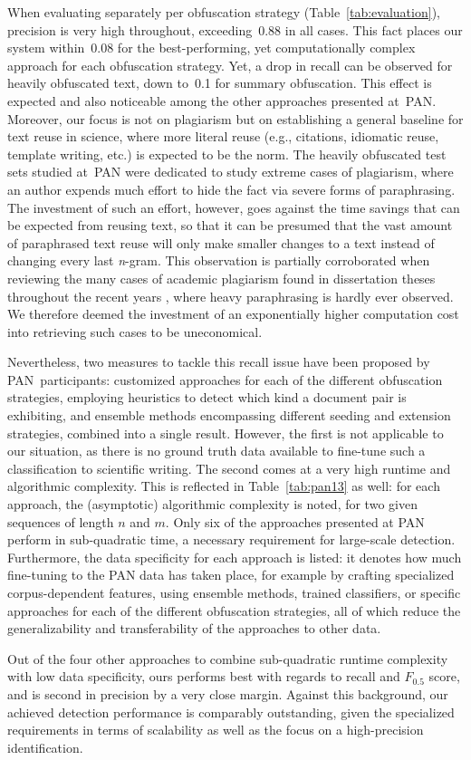 When evaluating separately per obfuscation strategy (Table~\ref{tab:evaluation}), precision is very high throughout, exceeding~0.88 in all cases. This fact places our system within~0.08 for the best-performing, yet computationally complex approach for each obfuscation strategy. Yet, a drop in recall can be observed for heavily obfuscated text, down to~0.1 for summary obfuscation. This effect is expected and also noticeable among the other approaches presented at~PAN. Moreover, our focus is not on plagiarism but on establishing a general baseline for text reuse in science, where more literal reuse (e.g., citations, idiomatic reuse, template writing, etc.) is expected to be the norm. The heavily obfuscated test sets studied at~PAN were dedicated to study extreme cases of plagiarism, where an author expends much effort to hide the fact via severe forms of paraphrasing. The investment of such an effort, however, goes against the time savings that can be expected from reusing text, so that it can be presumed that the vast amount of paraphrased text reuse will only make smaller changes to a text instead of changing every last \emph{n}-gram. This observation is partially corroborated when reviewing the many cases of academic plagiarism found in dissertation theses throughout the recent years \cite{vroniplag:2021}, where heavy paraphrasing is hardly ever observed. We therefore deemed the investment of an exponentially higher computation cost into retrieving such cases to be uneconomical.

Nevertheless, two measures to tackle this recall issue have been proposed by PAN~participants:
\Ni
customized approaches for each of the different obfuscation strategies, employing heuristics to detect which kind a document pair is exhibiting, and
\Nii
ensemble methods encompassing different seeding and extension strategies, combined into a single result.
However, the first is not applicable to our situation, as there is no ground truth data available to fine-tune such a classification to scientific writing. The second comes at a very high runtime and algorithmic complexity.
This is reflected in Table~\ref{tab:pan13} as well: for each approach, the (asymptotic) algorithmic complexity is noted, for two given sequences of length $n$ and $m$. Only six of the approaches presented at PAN perform in sub-quadratic time, a necessary requirement for large-scale detection. Furthermore, the data specificity for each approach is listed: it denotes how much fine-tuning to the PAN data has taken place, for example by crafting specialized corpus-dependent features, using ensemble methods, trained classifiers, or specific approaches for each of the different obfuscation strategies, all of which reduce the generalizability and transferability of the approaches to other data. 

Out of the four other approaches to combine sub-quadratic runtime complexity with low data specificity, ours performs best with regards to recall and $F_{0.5}$ score, and is second in precision by a very close margin. Against this background, our achieved detection performance is comparably outstanding, given the specialized requirements in terms of scalability as well as the focus on a high-precision identification.
